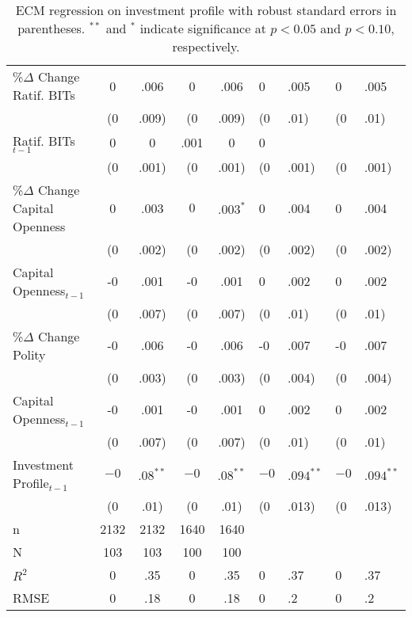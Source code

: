 \begin{table}[ht]
{\begin{tabular}{lcccc}
  \%$\Delta$ Change Ratif. BITs & 0&.006 & 0&.006 & 0&.005 & 0&.005 \\ 
   & (0&.009) & (0&.009) & (0&.01) & (0&.01) \\ 
  Ratif. BITs$_{t-1}$ & 0 & 0&.001 & 0 & 0 \\ 
   & (0&.001) & (0&.001) & (0&.001) & (0&.001) \\ 
  \%$\Delta$ Change Capital Openness & 0&.003 & $0$&$.003^{\ast}$ & 0&.004 & 0&.004 \\ 
   & (0&.002) & (0&.002) & (0&.002) & (0&.002) \\ 
  Capital Openness$_{t-1}$ & -0&.001 & -0&.001 & 0&.002 & 0&.002 \\ 
   & (0&.007) & (0&.007) & (0&.01) & (0&.01) \\ 
  \%$\Delta$ Change Polity & -0&.006 & -0&.006 & -0&.007 & -0&.007 \\ 
   & (0&.003) & (0&.003) & (0&.004) & (0&.004) \\ 
  Capital Openness$_{t-1}$ & -0&.001 & -0&.001 & 0&.002 & 0&.002 \\ 
   & (0&.007) & (0&.007) & (0&.01) & (0&.01) \\ 
  Investment Profile$_{t-1}$ & $-0$&$.08^{\ast\ast}$ & $-0$&$.08^{\ast\ast}$ & $-0$&$.094^{\ast\ast}$ & $-0$&$.094^{\ast\ast}$ \\ 
   & (0&.01) & (0&.01) & (0&.013) & (0&.013) \\ 
   \hline
n & 2132 & 2132 & 1640 & 1640 \\ 
  N & 103 & 103 & 100 & 100 \\ 
  $R^{2}$ & 0&.35 & 0&.35 & 0&.37 & 0&.37 \\ 
  RMSE & 0&.18 & 0&.18 & 0&.2 & 0&.2 \\ 
   \hline
\hline
\end{tabular}
}
\caption{ECM regression on investment profile with robust standard errors in parentheses. $^{**}$ and $^{*}$ indicate significance at $p< 0.05 $ and $p< 0.10 $, respectively.} 
\end{table}
